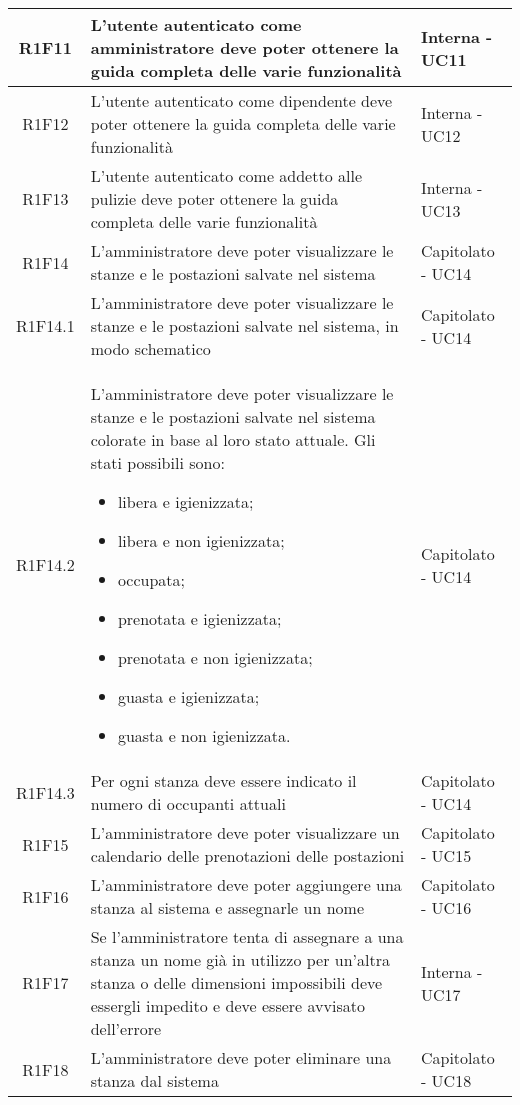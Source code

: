 \begin{center}
\begin{longtable}{|c|p{10cm}|p{4cm}|}
		\hline
		R1F11	&	L'utente autenticato come amministratore deve poter ottenere la guida completa delle varie funzionalità& Interna - UC11	\\
		\hline
		R1F12	&	L'utente autenticato come dipendente deve poter ottenere la guida completa delle varie funzionalità& Interna - UC12	\\
		\hline
		R1F13	&	L'utente autenticato come addetto alle pulizie deve poter ottenere la guida completa delle varie funzionalità& Interna - UC13	\\
		\hline
		R1F14&L'amministratore deve poter visualizzare le stanze e le postazioni salvate nel sistema& Capitolato - UC14	\\
		\hline
		R1F14.1&L'amministratore deve poter visualizzare le stanze e le postazioni salvate nel sistema, in modo schematico& Capitolato - UC14	\\
		\hline
		R1F14.2&L'amministratore deve poter visualizzare le stanze e le postazioni salvate nel sistema colorate in base al loro stato attuale. Gli stati possibili sono:
		\begin{itemize}
			\item libera e igienizzata;
			\item libera e non igienizzata;
			\item occupata;
			\item prenotata e igienizzata;
			\item prenotata e non igienizzata;
			\item guasta e igienizzata;
			\item guasta e non igienizzata.
		\end{itemize}& Capitolato - UC14	\\
		\hline
		R1F14.3&Per ogni stanza deve essere indicato il numero di occupanti attuali	& Capitolato - UC14	\\
		\hline
		R1F15&L'amministratore deve poter visualizzare un calendario delle prenotazioni delle postazioni	& Capitolato - UC15	\\
		\hline
		R1F16&L'amministratore deve poter aggiungere una stanza al sistema e assegnarle un nome	& Capitolato - UC16	\\
		\hline
		R1F17 & Se l'amministratore tenta di assegnare a una stanza un nome già in utilizzo per un'altra stanza o delle dimensioni impossibili deve essergli impedito e deve essere avvisato dell'errore & Interna - UC17 \\
		\hline
		R1F18&L'amministratore deve poter eliminare una stanza dal sistema	& Capitolato - UC18	\\

\end{longtable}
\end{center}
